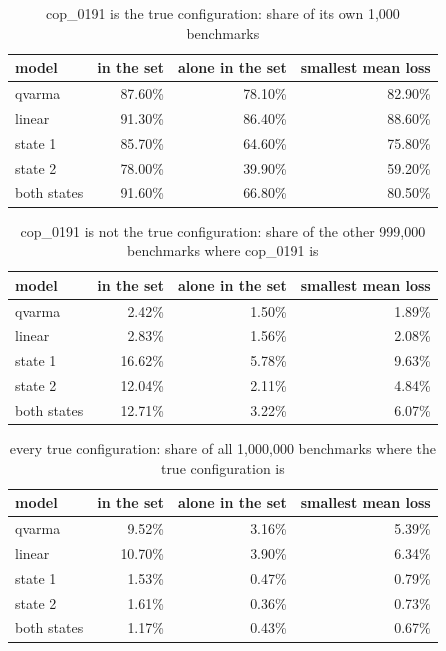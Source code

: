 \begin{table}[htbp]
\centering
\caption{cop\_0191 is the true configuration: share of its own 1,000 benchmarks}
\label{tab:cop_0191_truth}
\begin{tabular}{lrrr}
\hline
model & in the set & alone in the set & smallest mean loss \\
\hline
qvarma & 87.60\% & 78.10\% & 82.90\% \\
linear & 91.30\% & 86.40\% & 88.60\% \\
state 1 & 85.70\% & 64.60\% & 75.80\% \\
state 2 & 78.00\% & 39.90\% & 59.20\% \\
both states & 91.60\% & 66.80\% & 80.50\% \\
\hline
\end{tabular}
\end{table}

\begin{table}[htbp]
\centering
\caption{cop\_0191 is not the true configuration: share of the other 999,000 benchmarks where cop\_0191 is}
\label{tab:cop_0191_wrong_answer}
\begin{tabular}{lrrr}
\hline
model & in the set & alone in the set & smallest mean loss \\
\hline
qvarma & 2.42\% & 1.50\% & 1.89\% \\
linear & 2.83\% & 1.56\% & 2.08\% \\
state 1 & 16.62\% & 5.78\% & 9.63\% \\
state 2 & 12.04\% & 2.11\% & 4.84\% \\
both states & 12.71\% & 3.22\% & 6.07\% \\
\hline
\end{tabular}
\end{table}

\begin{table}[htbp]
\centering
\caption{every true configuration: share of all 1,000,000 benchmarks where the true configuration is}
\label{tab:cop_0191_every_truth}
\begin{tabular}{lrrr}
\hline
model & in the set & alone in the set & smallest mean loss \\
\hline
qvarma & 9.52\% & 3.16\% & 5.39\% \\
linear & 10.70\% & 3.90\% & 6.34\% \\
state 1 & 1.53\% & 0.47\% & 0.79\% \\
state 2 & 1.61\% & 0.36\% & 0.73\% \\
both states & 1.17\% & 0.43\% & 0.67\% \\
\hline
\end{tabular}
\end{table}

